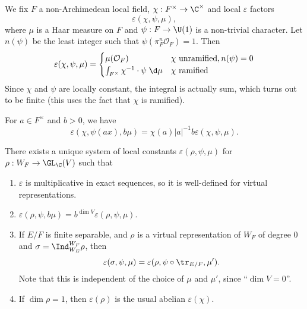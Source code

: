 \documentclass[a4paper]{article}
\begin{document}
We fix $F$ a non-Archimedean local field, $\chi: F^\times \to \C^\times$ and local $\varepsilon$ factors
\[
  \varepsilon(\chi, \psi, \mu),
\]
where $\mu$ is a Haar measure on $F$ and $\psi: F \to \U(1)$ is a non-trivial character. Let $n(\psi)$ be the least integer such that $\psi(\pi^n_F \mathcal{O}_F) = 1$. Then
\[
  \varepsilon(\chi, \psi, \mu) =
  \begin{cases}
    \mu(\mathcal{O}_F) & \chi\text{ unramified}, n(\psi) = 0\\
    \int_{F^\times} \chi^{-1} \cdot \psi \;\d \mu & \chi\text{ ramified}
  \end{cases}
\]
Since $\chi$ and $\psi$ are locally constant, the integral is actually sum, which turns out to be finite (this uses the fact that $\chi$ is ramified).

For $a \in F^\times$ and $b > 0$, we have
\[
  \varepsilon(\chi, \psi(ax), b \mu) = \chi(a) |a|^{-1} b \varepsilon(\chi, \psi, \mu).
\]
\begin{thm}
  There exists a unique system of local constants $\varepsilon(\rho, \psi, \mu)$ for $\rho: W_F \to \GL_\C(V)$ such that
  \begin{enumerate}
    \item $\varepsilon$ is multiplicative in exact sequences, so it is well-defined for virtual representations.
    \item $\varepsilon(\rho, \psi, b\mu) = b^{\dim V} \varepsilon(\rho, \psi, \mu)$.
    \item If $E/F$ is finite separable, and $\rho$ is a virtual representation of $W_F$ of degree $0$ and $\sigma = \Ind_{W_E}^{W_F} \rho$, then
      \[
        \varepsilon(\sigma, \psi, \mu) = \varepsilon(\rho, \psi \circ \tr_{E/F}, \mu').
      \]
      Note that this is independent of the choice of $\mu$ and $\mu'$, since ``$\dim V = 0$''.
    \item If $\dim \rho = 1$, then $\varepsilon(\rho)$ is the usual abelian $\varepsilon(\chi)$.
  \end{enumerate}
\end{thm}

\printindex
\end{document}
